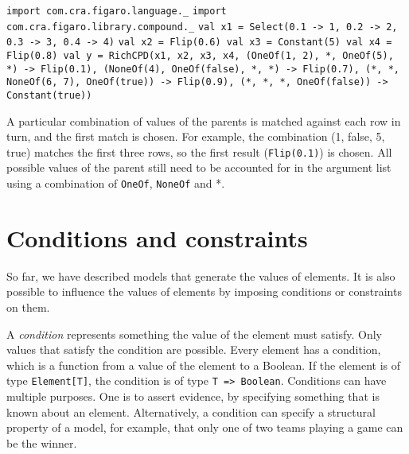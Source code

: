 \begin{flushleft}
\texttt{import com.cra.figaro.language.\_}
\newline \texttt{import com.cra.figaro.library.compound.\_}
\newline \texttt{val x1 = Select(0.1 -> 1, 0.2 -> 2, 0.3 -> 3, 0.4 -> 4)}
\newline \texttt{val x2 = Flip(0.6) 
\newline val x3 = Constant(5) 
\newline val x4 = Flip(0.8)
\newline val y = RichCPD(x1, x2, x3, x4,
\newline \tab (OneOf(1, 2), *, OneOf(5), *) -> Flip(0.1), 
\newline \tab (NoneOf(4), OneOf(false), *, *) -> Flip(0.7), 
\newline \tab (*, *, NoneOf(6, 7), OneOf(true)) -> Flip(0.9), 
\newline \tab (*, *, *, OneOf(false)) -> Constant(true))}
\end{flushleft}

A particular combination of values of the parents is matched against each row in turn, and the first match is chosen. For example, the combination (1, false, 5, true) matches the first three rows, so the first result (\texttt{Flip(0.1)}) is chosen. All possible values of the parent still need to be accounted for in the argument list using a combination of \texttt{OneOf}, \texttt{NoneOf} and *.

\section{Conditions and constraints}

So far, we have described models that generate the values of elements. It is also possible to influence the values of elements by imposing conditions or constraints on them.

A \emph{condition} represents something the value of the element must satisfy. Only values that satisfy the condition are possible. Every element has a condition, which is a function from a value of the element to a Boolean. If the element is of type \texttt{Element[T]}, the condition is of type \texttt{T => Boolean}. Conditions can have multiple purposes. One is to assert evidence, by specifying something that is known about an element. Alternatively, a condition can specify a structural property of a model, for example, that only one of two teams playing a game can be the winner.

